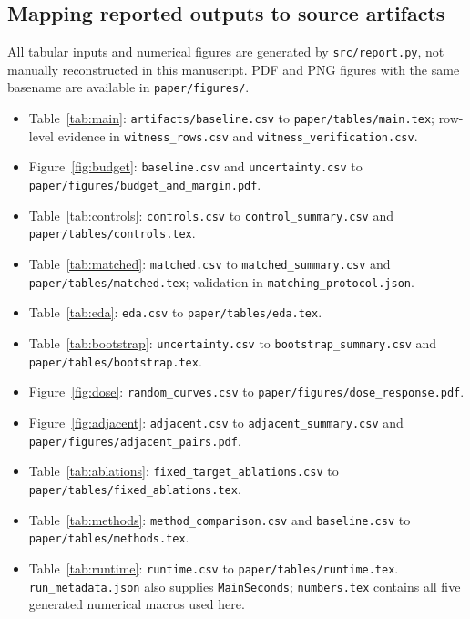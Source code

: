 \subsection{Mapping reported outputs to source artifacts}
All tabular inputs and numerical figures are generated by \texttt{src/report.py}, not manually reconstructed in this manuscript. PDF and PNG figures with the same basename are available in \texttt{paper/figures/}.
\begin{itemize}
\item Table~\ref{tab:main}: \texttt{artifacts/baseline.csv} to \texttt{paper/tables/main.tex}; row-level evidence in \texttt{witness\_rows.csv} and \texttt{witness\_verification.csv}.
\item Figure~\ref{fig:budget}: \texttt{baseline.csv} and \texttt{uncertainty.csv} to \texttt{paper/figures/budget\_and\_margin.pdf}.
\item Table~\ref{tab:controls}: \texttt{controls.csv} to \texttt{control\_summary.csv} and \texttt{paper/tables/controls.tex}.
\item Table~\ref{tab:matched}: \texttt{matched.csv} to \texttt{matched\_summary.csv} and \texttt{paper/tables/matched.tex}; validation in \texttt{matching\_protocol.json}.
\item Table~\ref{tab:eda}: \texttt{eda.csv} to \texttt{paper/tables/eda.tex}.
\item Table~\ref{tab:bootstrap}: \texttt{uncertainty.csv} to \texttt{bootstrap\_summary.csv} and \texttt{paper/tables/bootstrap.tex}.
\item Figure~\ref{fig:dose}: \texttt{random\_curves.csv} to \texttt{paper/figures/dose\_response.pdf}.
\item Figure~\ref{fig:adjacent}: \texttt{adjacent.csv} to \texttt{adjacent\_summary.csv} and \texttt{paper/figures/adjacent\_pairs.pdf}.
\item Table~\ref{tab:ablations}: \texttt{fixed\_target\_ablations.csv} to \texttt{paper/tables/fixed\_ablations.tex}.
\item Table~\ref{tab:methods}: \texttt{method\_comparison.csv} and \texttt{baseline.csv} to \texttt{paper/tables/methods.tex}.
\item Table~\ref{tab:runtime}: \texttt{runtime.csv} to \texttt{paper/tables/runtime.tex}. \texttt{run\_metadata.json} also supplies \texttt{MainSeconds}; \texttt{numbers.tex} contains all five generated numerical macros used here.
\end{itemize}
